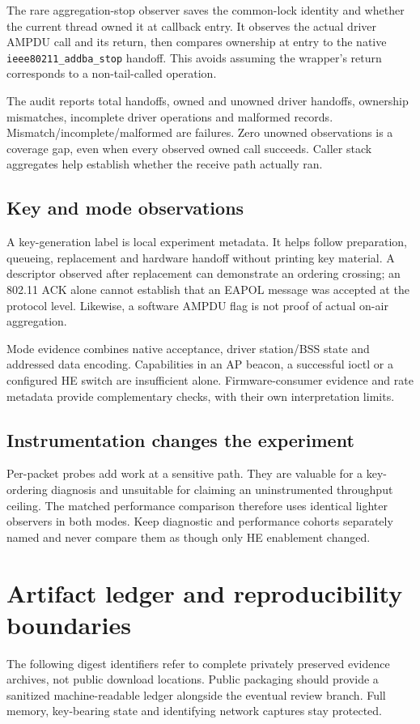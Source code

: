 \documentclass[11pt,letterpaper,oneside]{article}
\newcommand{\code}[1]{\texttt{\small #1}}
\begin{document}
The rare aggregation-stop observer saves the common-lock identity and whether the current thread owned it at callback entry. It observes the actual driver AMPDU call and its return, then compares ownership at entry to the native \code{ieee80211\_addba\_stop} handoff. This avoids assuming the wrapper's return corresponds to a non-tail-called operation.

The audit reports total handoffs, owned and unowned driver handoffs, ownership mismatches, incomplete driver operations and malformed records. Mismatch/incomplete/malformed are failures. Zero unowned observations is a coverage gap, even when every observed owned call succeeds. Caller stack aggregates help establish whether the receive path actually ran.

\subsection{Key and mode observations}
A key-generation label is local experiment metadata. It helps follow preparation, queueing, replacement and hardware handoff without printing key material. A descriptor observed after replacement can demonstrate an ordering crossing; an 802.11 ACK alone cannot establish that an EAPOL message was accepted at the protocol level. Likewise, a software AMPDU flag is not proof of actual on-air aggregation.

Mode evidence combines native acceptance, driver station/BSS state and addressed data encoding. Capabilities in an AP beacon, a successful ioctl or a configured HE switch are insufficient alone. Firmware-consumer evidence and rate metadata provide complementary checks, with their own interpretation limits.

\subsection{Instrumentation changes the experiment}
Per-packet probes add work at a sensitive path. They are valuable for a key-ordering diagnosis and unsuitable for claiming an uninstrumented throughput ceiling. The matched performance comparison therefore uses identical lighter observers in both modes. Keep diagnostic and performance cohorts separately named and never compare them as though only HE enablement changed.

\section{Artifact ledger and reproducibility boundaries}
The following digest identifiers refer to complete privately preserved evidence archives, not public download locations. Public packaging should provide a sanitized machine-readable ledger alongside the eventual review branch. Full memory, key-bearing state and identifying network captures stay protected.
\end{document}
